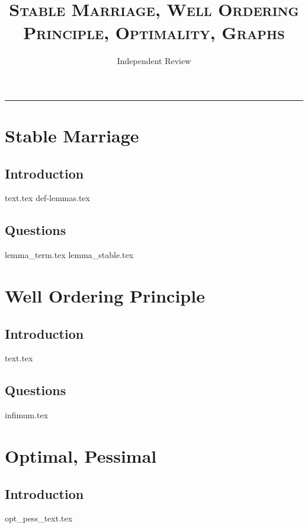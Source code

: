 \documentclass{exam}
\title{\textsc{Stable Marriage, Well Ordering Principle, Optimality, Graphs}}
\date{Independent Review}
\begin{document}
\maketitle
\rule{\textwidth}{0.15em}
\fontsize{12}{15}\selectfont
\thispagestyle{empty}


\section{Stable Marriage}
\subsection{Introduction}
{text.tex}
{def-lemmas.tex}
\subsection{Questions}
\begin{questions}
{lemma_term.tex}
{lemma_stable.tex}
\end{questions}

\section{Well Ordering Principle}
\subsection{Introduction}
{text.tex}
\subsection{Questions}
\begin{questions}
{infimum.tex}
\end{questions}

\section{Optimal, Pessimal}
\subsection{Introduction}
{opt_pess_text.tex}
\end{document}
